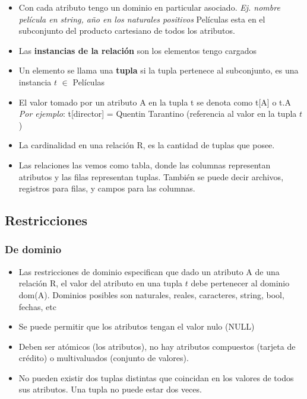 \begin{itemize}
\item Con cada atributo tengo un dominio en particular asociado. \textit{Ej. nombre película en string, año en los naturales positivos} Películas esta en el subconjunto del producto cartesiano de todos los atributos.
\item Las\textbf{ instancias de la relación} son los elementos tengo cargados
\item Un elemento se llama una \textbf{tupla} si la tupla pertenece al subconjunto, es una instancia $t$ $\in$ Películas

\item El valor tomado por un atributo A en la tupla t se denota como t[A] o t.A
\textit{Por ejemplo}: t[director] = Quentin Tarantino (referencia al valor en la tupla $t$)

\item La cardinalidad en una relación R, es la cantidad de tuplas que posee.
\item Las relaciones las vemos como tabla, donde las columnas representan atributos y las filas representan tuplas. También se puede decir archivos, registros para filas, y campos para las columnas.
\end{itemize}


\subsection*{Restricciones}

\subsubsection*{De dominio}
\begin{itemize}
\item Las restricciones de dominio especifican que dado un atributo A de una relación R, el valor del atributo en una tupla $t$ debe pertenecer al dominio dom(A). Dominios posibles son naturales, reales, caracteres, string, bool, fechas, etc
\item Se puede permitir que los atributos tengan el valor nulo (NULL)
\item Deben ser atómicos (los atributos), no hay atributos compuestos (tarjeta de crédito) o multivaluados (conjunto de valores).
\item No pueden existir dos tuplas distintas que coincidan en los valores de todos sus atributos. Una tupla no puede estar dos veces.
\end{itemize}


